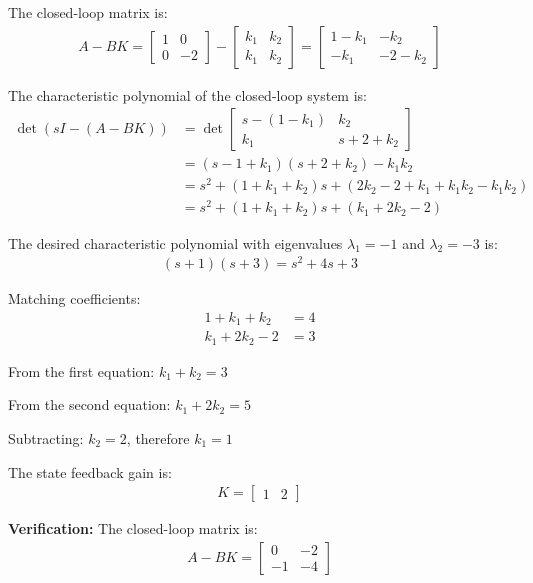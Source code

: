 \documentclass[11pt,a4paper]{article}
\begin{document}
The closed-loop matrix is:
\begin{align}
A - BK = \begin{bmatrix} 1 & 0 \\ 0 & -2 \end{bmatrix} - \begin{bmatrix} k_1 & k_2 \\ k_1 & k_2 \end{bmatrix} = \begin{bmatrix} 1-k_1 & -k_2 \\ -k_1 & -2-k_2 \end{bmatrix}
\end{align}

The characteristic polynomial of the closed-loop system is:
\begin{align}
\det(sI - (A-BK)) &= \det\begin{bmatrix} s-(1-k_1) & k_2 \\ k_1 & s+2+k_2 \end{bmatrix} \\
&= (s-1+k_1)(s+2+k_2) - k_1k_2 \\
&= s^2 + (1+k_1+k_2)s + (2k_2 - 2 + k_1 + k_1k_2 - k_1k_2) \\
&= s^2 + (1+k_1+k_2)s + (k_1 + 2k_2 - 2)
\end{align}

The desired characteristic polynomial with eigenvalues $\lambda_1 = -1$ and $\lambda_2 = -3$ is:
\begin{align}
(s+1)(s+3) = s^2 + 4s + 3
\end{align}

Matching coefficients:
\begin{align}
1 + k_1 + k_2 &= 4 \\
k_1 + 2k_2 - 2 &= 3
\end{align}

From the first equation: $k_1 + k_2 = 3$

From the second equation: $k_1 + 2k_2 = 5$

Subtracting: $k_2 = 2$, therefore $k_1 = 1$

The state feedback gain is:
\begin{align}
K = \begin{bmatrix} 1 & 2 \end{bmatrix}
\end{align}

\textbf{Verification:} The closed-loop matrix is:
\begin{align}
A - BK = \begin{bmatrix} 0 & -2 \\ -1 & -4 \end{bmatrix}
\end{align}
\end{document}
